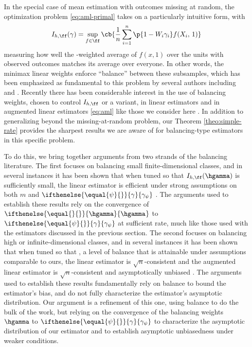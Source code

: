 \documentclass[aos,submission]{imsart}
\theoremstyle{plain}
\theoremstyle{remark}
\newcommand{\riesz}[1][]{\ifthenelse{\equal{#1}{}}{\gamma}{\gamma_{{#1}}}}
\newcommand{\hriesz}[1][]{\ifthenelse{\equal{#1}{}}{\hgamma}{\hgamma_{{#1}}}}
\begin{document}
In the special case of mean estimation with outcomes missing at random, the optimization
problem \eqref{eq:aml-primal} takes on a particularly intuitive form, with
\begin{equation}
I_{h,\ff}(\gamma) = \sup_{f \in \ff} \cb{\frac{1}{n} \sum_{i = 1}^n \p{1 - W_i \gamma_i} f(X_i, \, 1)}
\end{equation}
measuring how well the \smash{$\gamma$}-weighted average of $f(x,1)$ over the units with observed outcomes
matches its average over everyone. In other words, the minimax linear weights enforce
``balance'' between these subsamples, which has been emphasized as fundamental to this problem by several authors
including \citet{rosenbaum1983central} and \citet*{hirano2003efficient}. Recently there has been considerable
interest in the use of balancing weights, chosen to control $I_{h,\ff}$ or a variant,
in linear estimators and in augmented linear estimators \eqref{eq:aml} like those we consider here \citep{athey2016approximate,chan2015globally,graham1,graham2,hainmueller,imai2014covariate,kallus2016generalized,ning2017high,wang2017approximate,wong2017kernel,zhao2016covariate,zubizarreta2015stable}. 
In addition to generalizing beyond the missing-at-random problem, our Theorem \ref{theo:simple-rate} provides the sharpest results we are aware of for
balancing-type estimators in this specific problem. 

To do this, we bring together arguments from two strands of the balancing literature.
The first focuses on balancing small finite-dimensional classes, 
and in several instances it has been shown that when tuned so that $I_{h,\ff}(\hgamma)$ is sufficiently small, 
the linear estimator is efficient under strong assumptions on both $m$ and $\riesz[\psi]$ \citep{chan2015globally,fan2016improving,graham1,wang2017approximate}.
The arguments used to establish these results rely on the convergence of $\hriesz$ to $\riesz[\psi]$ at sufficient rate, much like those
used with the estimators discussed in the previous section. 
The second focuses on balancing high or infinite-dimensional classes, 
and in several instances it has been shown that when tuned so that ,
a level of balance that is attainable under assumptions comparable to ours, the linear estimator is $\sqrt{n}$-consistent and 
the augmented linear estimator is $\sqrt{n}$-consistent and asymptotically unbiased \citep{athey2016approximate,kallus2016generalized,wong2017kernel}. 
The arguments used to establish these results fundamentally rely on balance to bound the estimator's bias, 
and do not fully characterize the estimator's asymptotic distribution. Our argument is a refinement of this one,
using balance to do the bulk of the work, but relying on the convergence of the balancing weights $\hgamma$ to $\riesz[\psi]$ 
to characterize the asymptotic distribution of our estimator and to establish asymptotic unbiasedness under weaker conditions.
\end{document}
